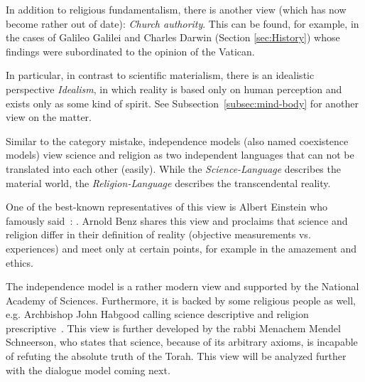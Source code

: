 In addition to religious fundamentalism, there is another view (which has now become rather out of date): \emph{Church authority}.
This can be found, for example, in the cases of Galileo Galilei and Charles Darwin (Section \ref{sec:History}) whose findings were subordinated to the opinion of the Vatican.


In particular, in contrast to scientific materialism, there is an idealistic perspective \emph{Idealism}, in which reality is based only on human perception and exists only as some kind of spirit.
See Subsection~\ref{subsec:mind-body} for another view on the matter.




\label{subsec:independence}

Similar to the category mistake, independence models (also named coexistence models) view science and religion as two independent languages that can not be translated into each other (easily).
While the \textit{Science-Language} describes the  material world, the \textit{Religion-Language} describes the transcendental reality.

One of the best-known representatives of this view is Albert Einstein who famously said~\cite[p.~605\,ff.]{einstein1940science}:
.
Arnold Benz shares this view and proclaims that science and religion
differ in their definition of reality (objective measurements vs. experiences) and meet only at certain points, for example in the amazement and ethics.

The independence model is a rather modern view and supported by the
National Academy of Sciences.
Furthermore, it is backed by some religious people as well, e.g. Archbishop John Habgood calling science descriptive and religion prescriptive~\cite{habgood1964religion}.
This view is further developed by the rabbi Menachem Mendel Schneerson, who states that science, because of its arbitrary axioms, is incapable of refuting the absolute truth of the Torah. This view will be analyzed further with the dialogue model coming next.

